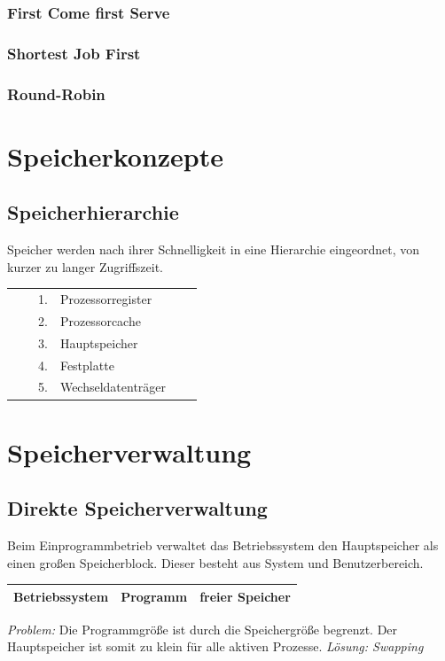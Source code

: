 \documentclass[12pt,a4paper]{article}
\begin{document}
\subsubsection{First Come first Serve}

\subsubsection{Shortest Job First}

\subsubsection{Round-Robin}

\section{Speicherkonzepte}

\subsection{Speicherhierarchie}
    Speicher werden nach ihrer Schnelligkeit in eine Hierarchie eingeordnet, von kurzer zu langer Zugriffszeit.
	\begin{center}
		\begin{tabularx}{13cm}{XXXlXX}
			&&1.& Prozessorregister&&\\
			&&2.& Prozessorcache&&\\
			&&3.& Hauptspeicher&&\\
			&&4.& Festplatte&&\\
			&&5.& Wechseldatenträger&&\\
		\end{tabularx}
	\end{center}

\section{Speicherverwaltung}

\subsection{Direkte Speicherverwaltung}
    Beim Einprogrammbetrieb verwaltet das Betriebssystem den Hauptspeicher als einen großen Speicherblock. Dieser besteht aus System und Benutzerbereich.
    \begin{center}
        \begin{tabularx}{13cm}{|X|X|X|}
            \hline
            Betriebssystem&Programm&freier Speicher \\
            \hline
        \end{tabularx}
    \end{center}
    \textit{Problem:}\newline
    Die Programmgröße ist durch die Speichergröße begrenzt. Der Hauptspeicher ist somit zu klein für alle aktiven Prozesse.\newline
    \textit{Lösung: Swapping}
\end{document}
